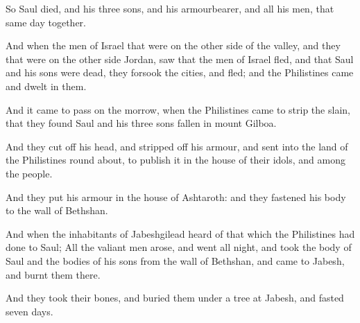 \Verse So Saul died, and his three sons, and his armourbearer, and all his men, that same day together.

\Verse And when the men of Israel that were on the other side of the valley, and they that were on the other side Jordan, saw that the men of Israel fled, and that Saul and his sons were dead, they forsook the cities, and fled; and the Philistines came and dwelt in them.

\Verse And it came to pass on the morrow, when the Philistines came to strip the slain, that they found Saul and his three sons fallen in mount Gilboa.

\Verse And they cut off his head, and stripped off his armour, and sent into the land of the Philistines round about, to publish it in the house of their idols, and among the people.

\Verse And they put his armour in the house of Ashtaroth: and they fastened his body to the wall of Bethshan.

\Verse And when the inhabitants of Jabeshgilead heard of that which the Philistines had done to Saul; \Verse All the valiant men arose, and went all night, and took the body of Saul and the bodies of his sons from the wall of Bethshan, and came to Jabesh, and burnt them there.

\Verse And they took their bones, and buried them under a tree at Jabesh, and fasted seven days.

